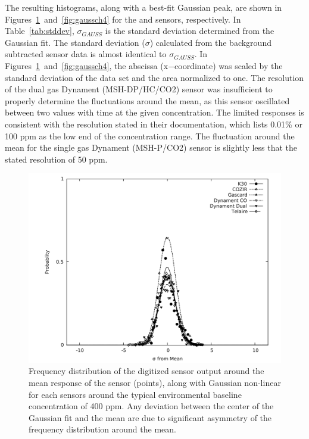 \documentclass[sensors,article,submit,moreauthors,pdftex]{Definitions/mdpi}
\begin{document}
			The resulting histograms, along with a best-fit Gaussian peak, are shown in Figures~\ref{fig:gaussco2}~and~\ref{fig:gaussch4} for the  and  sensors, respectively.
			In Table~\ref{tab:stddev}, $\sigma_{GAUSS}$ is the standard deviation determined from the Gaussian fit.
			The standard deviation ($\sigma$) calculated from the background subtracted sensor data is almost identical to $\sigma_{GAUSS}$.
			In Figures~\ref{fig:gaussco2}~and~\ref{fig:gaussch4}, the abscissa (x$-$coordinate) was scaled by the standard deviation of the data set and the area normalized to one.
			The resolution of the dual gas Dynament (MSH-DP/HC/CO2) sensor was insufficient to properly determine the fluctuations around the mean, as this sensor oscillated between two values with time at the given concentration.
			The limited responses is consistent with the resolution stated in their documentation, which lists 0.01\% or 100 ppm as the low end of the concentration range.
			The fluctuation around the mean for the single gas Dynament (MSH-P/CO2) sensor is slightly less that the stated resolution of 50 ppm.
			
	
			\begin{figure}[!t]
				\centering
				\includegraphics[width=\columnwidth]{honey7.pdf}
				\caption{Frequency distribution of the digitized sensor output around the mean response of the sensor (points), along with Gaussian non-linear for each  sensors around the typical environmental baseline concentration of 400 ppm.
				Any deviation between the center of the Gaussian fit and the mean are due to significant asymmetry of the frequency distribution around the mean.}
				\label{fig:gaussco2}
			\end{figure}
			
\end{document}

